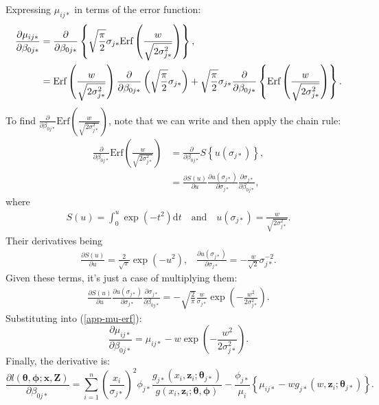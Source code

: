 Expressing $\mu_{ij*}$ in terms of the error function:
\begin{align}
\frac{\partial \mu_{ij*}}{\partial \beta_{0j*}} &= \frac{\partial}{\partial \beta_{0j*}} \left \{ \sqrt{\frac{\pi}{2}} \sigma_{j*} \text{Erf}\left (\frac{w}{\sqrt{2\sigma_{j*}^2}}\right ) \right \} \notag, \\
&= \text{Erf}\left (\frac{w}{\sqrt{2\sigma_{j*}^2}}\right ) \frac{\partial}{\partial \beta_{0j*}} \left ( \sqrt{\frac{\pi}{2}} \sigma_{j*} \right ) + \sqrt{\frac{\pi}{2}} \sigma_{j*} \frac{\partial}{\partial \beta_{0j*}} \left \{ \text{Erf}\left (\frac{w}{\sqrt{2\sigma_{j*}^2}}\right ) \right \}. \label{app-mu-erf}
\end{align}
To find $\frac{\partial}{\partial \beta_{0j*}} \text{Erf}\left (\frac{w}{\sqrt{2\sigma_{j*}^2}}\right )$, note that we can write and then apply the chain rule:
\begin{align*}
\frac{\partial}{\partial \beta_{0j*}} \text{Erf}\left (\frac{w}{\sqrt{2\sigma_{j*}^2}}\right ) &= \frac{\partial}{\partial \beta_{0j*}} S \left \{ u(\sigma_{j*})\right \}, \\
&= \frac{\partial S(u)}{\partial u} \frac{\partial u(\sigma_{j*})}{\partial \sigma_{j*} } \frac{\partial \sigma_{j*}}{\partial \beta_{0j*}},
\end{align*}
where 
\begin{align*}
S(u) = \int_0^{u} \exp \left (-t^2 \right ) \text{d}t \quad \text{and} \quad u(\sigma_{j*})=\frac{w}{\sqrt{2\sigma_{j*}^2}}.
\end{align*}
Their derivatives being
\begin{align*}
\frac{\partial S(u)}{\partial u} = \frac{2}{\sqrt{\pi}} \exp(-u^2) \text{,} \quad \frac{\partial u(\sigma_{j*})}{\partial \sigma_{j*}} = -\frac{w}{\sqrt{2}}\sigma_{j*}^{-2}.
\end{align*}
Given these terms, it's just a case of multiplying them:
\begin{align*}
\frac{\partial S(u)}{\partial u} \frac{\partial u(\sigma_{j*})}{\partial \sigma_{j*} } \frac{\partial \sigma_{j*}}{\partial \beta_{0j*}} = - \sqrt{\frac{2}{\pi}} \frac{w}{\sigma_{j*}} \exp\left ( -\frac{w^2}{2\sigma_{j*}^2} \right ).
\end{align*}
Substituting into (\ref{app-mu-erf}):
\begin{equation*}
\frac{\partial \mu_{ij*}}{\partial \beta_{0j*}} =  \mu_{ij*} - w \exp\left ( -\frac{w^2}{2\sigma_{j*}^2} \right ).
\end{equation*}
Finally, the derivative is:
\begin{equation*}
\frac{\partial l(\bm{\theta}, \bm{\phi}; \mathbf{x},\mathbf{Z})}{\partial \beta_{0j*}} = \sum_{i=1}^n \left ( \frac{x_i}{\sigma_{j*}}\right )^2 \phi_{j*} \frac{g_{j*}(x_i,\mathbf{z}_i; \bm{\theta}_{j*})}{g(x_i,\mathbf{z}_i; \bm{\theta},\bm{\phi})}  - \frac{\phi_{j*}}{\mu_i} \left \{ \mu_{ij*} - w g_{j*}(w,\mathbf{z}_i; \bm{\theta}_{j*}) \right \}.
\end{equation*}



